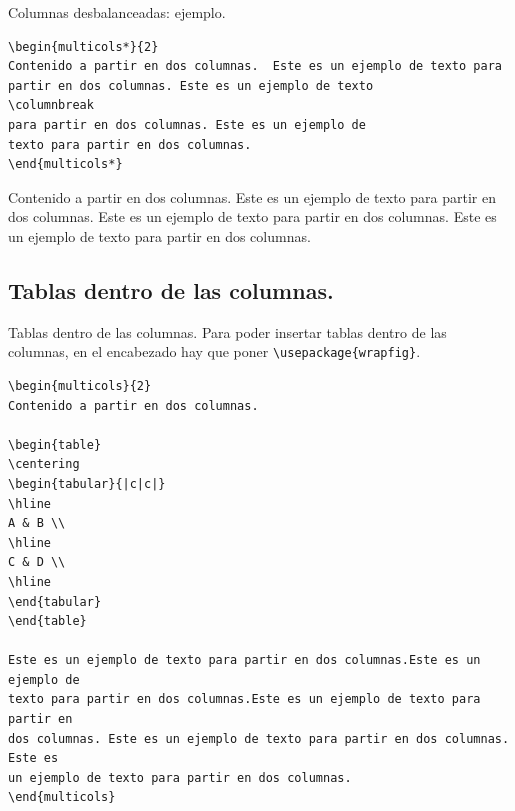 \documentclass[dvipsnames,xcolor, handout]{beamer}
\theoremstyle{plain}
\theoremstyle{definition}
\begin{document}
\begin{frame}[fragile]{Columnas desbalanceadas: ejemplo.}
\begin{footnotesize}
\begin{verbatim}
\begin{multicols*}{2}
Contenido a partir en dos columnas.  Este es un ejemplo de texto para
partir en dos columnas. Este es un ejemplo de texto 
\columnbreak 
para partir en dos columnas. Este es un ejemplo de 
texto para partir en dos columnas. 
\end{multicols*}
\end{verbatim}
\end{footnotesize}
\pause
\vspace*{0.6cm}
\begin{footnotesize}
    \begin{multicols*}{2}
    Contenido a partir en dos columnas.  Este es un ejemplo de texto para
partir en dos columnas. Este es un ejemplo de texto 
\columnbreak 
para partir en dos columnas. Este es un ejemplo de 
texto para partir en dos columnas. 
    \end{multicols*}
\end{footnotesize}

\end{frame}

\subsection{Tablas dentro de las columnas.}
\begin{frame}[fragile]{Tablas dentro de las columnas.}
Para poder insertar tablas dentro de las columnas, en el encabezado hay que poner \verb!\usepackage{wrapfig}!.

\begin{scriptsize}
\begin{verbatim}
\begin{multicols}{2}
Contenido a partir en dos columnas. 
  
\begin{table}
\centering
\begin{tabular}{|c|c|}
\hline
A & B \\
\hline
C & D \\
\hline
\end{tabular}
\end{table}

Este es un ejemplo de texto para partir en dos columnas.Este es un ejemplo de
texto para partir en dos columnas.Este es un ejemplo de texto para partir en
dos columnas. Este es un ejemplo de texto para partir en dos columnas. Este es
un ejemplo de texto para partir en dos columnas.
\end{multicols}
\end{verbatim}
\end{scriptsize}

\end{frame}
\end{document}
